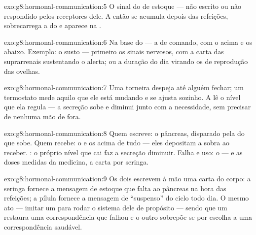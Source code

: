 \begin{solution}{exo:g8:hormonal-communication:5}
O sinal do  de estoque --- não escrito ou não respondido pelos
receptores dele. A  então se acumula depois das refeições,
sobrecarrega a  do  e aparece na .
\end{solution}

\begin{solution}{exo:g8:hormonal-communication:6}
Na base do  --- a  de comando, com o 
acima e os  abaixo. Exemplo: o susto --- primeiro os sinais
nervosos, com a carta das suprarrenais sustentando o alerta; ou a
duração do dia virando os  de reprodução das ovelhas.
\end{solution}

\begin{solution}{exo:g8:hormonal-communication:7}
Uma torneira despeja até alguém fechar; um termostato mede aquilo que
ele está mudando e se ajusta sozinho. A  lê o nível que ela
regula --- a secreção sobe e diminui junto com a necessidade, sem
precisar de nenhuma mão de fora.
\end{solution}

\begin{solution}{exo:g8:hormonal-communication:8}
Quem escreve: o pâncreas, disparado pela  do  que sobe.
Quem recebe: o  e os  acima de tudo --- eles depositam a
sobra ao receber. : o próprio nível que cai faz a
secreção diminuir. Falha e uso: o  --- e as doses medidas da
medicina, a carta por seringa.
\end{solution}

\begin{solution}{exo:g8:hormonal-communication:9}
Os dois escrevem à mão uma carta do corpo: a seringa fornece a
mensagem de estoque que falta ao pâncreas na hora das refeições; a
pílula fornece a mensagem de ``suspenso'' do ciclo todo dia. O mesmo
ato --- imitar um  para rodar o sistema dele de propósito ---
sendo que um restaura uma correspondência que falhou e o outro
sobrepõe-se por escolha a uma correspondência saudável.
\end{solution}

